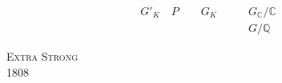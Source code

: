 \[
\begin{aligned}
G'_{K} \quad P \qquad G_{K} &\qquad G_{\mathbb{C}} / \mathbb{C} \\
                            &\qquad G / \mathbb{Q}
\end{aligned}
\]


\noindent\textsc{Extra Strong}\\
 1808
